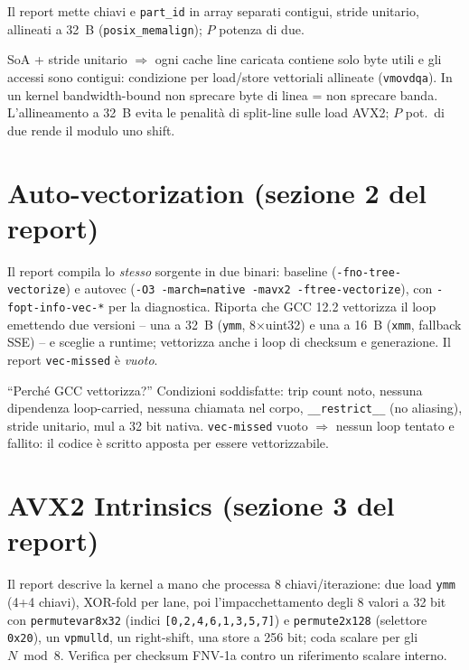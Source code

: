 \documentclass[11pt,a4paper]{article}
\begin{document}
Il report mette chiavi e \texttt{part\_id} in array separati contigui, stride unitario, allineati a 32~B (\texttt{posix\_memalign}); $P$ potenza di due.

\begin{motiv}
SoA + stride unitario $\Rightarrow$ ogni cache line caricata contiene solo byte utili e gli accessi sono contigui: condizione per load/store vettoriali allineate (\texttt{vmovdqa}). In un kernel bandwidth-bound non sprecare byte di linea = non sprecare banda. L'allineamento a 32~B evita le penalità di split-line sulle load AVX2; $P$ pot.\ di due rende il modulo uno shift.
\end{motiv}

\section{Auto-vectorization (sezione 2 del report)}

Il report compila lo \emph{stesso} sorgente in due binari: baseline (\texttt{-fno-tree-vectorize}) e autovec (\texttt{-O3 -march=native -mavx2 -ftree-vectorize}), con \texttt{-fopt-info-vec-*} per la diagnostica. Riporta che GCC 12.2 vettorizza il loop emettendo due versioni -- una a 32~B (\texttt{ymm}, 8$\times$uint32) e una a 16~B (\texttt{xmm}, fallback SSE) -- e sceglie a runtime; vettorizza anche i loop di checksum e generazione. Il report \texttt{vec-missed} è \emph{vuoto}.

\begin{difesa}
``Perché GCC vettorizza?'' Condizioni soddisfatte: trip count noto, nessuna dipendenza loop-carried, nessuna chiamata nel corpo, \texttt{\_\_restrict\_\_} (no aliasing), stride unitario, mul a 32 bit nativa. \texttt{vec-missed} vuoto $\Rightarrow$ nessun loop tentato e fallito: il codice è scritto apposta per essere vettorizzabile.
\end{difesa}

\section{AVX2 Intrinsics (sezione 3 del report)}

Il report descrive la kernel a mano che processa 8 chiavi/iterazione: due load \texttt{ymm} (4+4 chiavi), XOR-fold per lane, poi l'impacchettamento degli 8 valori a 32 bit con \texttt{permutevar8x32} (indici \texttt{[0,2,4,6,1,3,5,7]}) e \texttt{permute2x128} (selettore \texttt{0x20}), un \texttt{vpmulld}, un right-shift, una store a 256 bit; coda scalare per gli $N\bmod 8$. Verifica per checksum FNV-1a contro un riferimento scalare interno.
\end{document}
